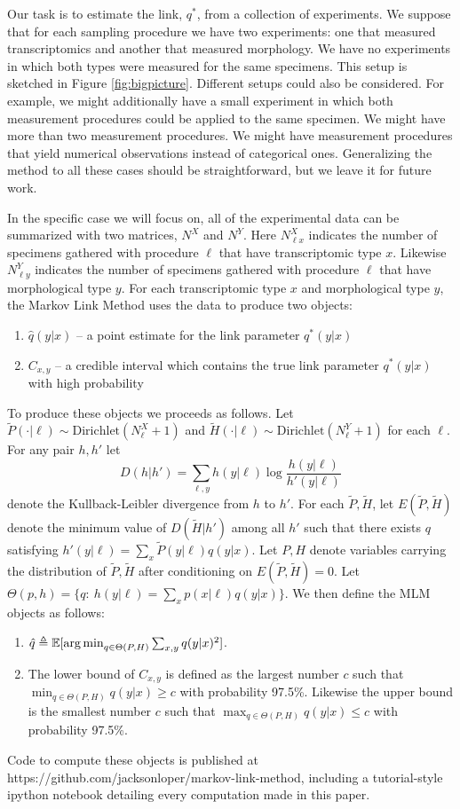 Our task is to estimate the link, $q^*$, from a collection of experiments.  We suppose that for each sampling procedure we have two experiments: one that measured transcriptomics and another that measured morphology.  We have no experiments in which both types were measured for the same specimens.  This setup is sketched in Figure \ref{fig:bigpicture}.  Different setups could also be considered.   For example, we might additionally have a small experiment in which both measurement procedures could be applied to the same specimen.  We might have more than two measurement procedures.  We might have measurement procedures that yield numerical observations instead of categorical ones.  Generalizing the method to all these cases should be straightforward, but we leave it for future work.  

In the specific case we will focus on, all of the experimental data can be summarized with two matrices, $N^X$ and $N^Y$.  Here $N^X_{\ell x}$ indicates the number of specimens gathered with procedure $\ell$ that have transcriptomic type $x$.  Likewise $N^Y_{\ell y}$ indicates the number of specimens gathered with procedure $\ell$ that have morphological type $y$.  For each transcriptomic type $x$ and morphological type $y$, the Markov Link Method uses the data to produce two objects:
%
\begin{enumerate}
    \item $\hat q(y|x)$ -- a point estimate for the link parameter $q^*(y|x)$
    \item $C_{x,y}$ -- a credible interval which contains the true link parameter $q^*(y|x)$ with high probability
\end{enumerate}
%
To produce these objects we proceeds as follows.  Let $\tilde P(\cdot |\ell) \sim \mathrm{Dirichlet}(N^X_\ell+1)$ and $\tilde H(\cdot |\ell) \sim \mathrm{Dirichlet}(N^Y_\ell+1)$ for each $\ell$.  For any pair $h,h'$ let 
\[
D(h|h') = \sum_{\ell,y} h(y|\ell) \log \frac{h(y|\ell)}{h'(y|\ell)}
\]
denote the Kullback-Leibler divergence from $h$ to $h'$.  For each $\tilde P,\tilde H$, let $E(\tilde P,\tilde H)$ denote the minimum value of $D(\tilde H|h')$ among all $h'$ such that there exists $q$ satisfying $h'(y|\ell)=\sum_x \tilde P(y|\ell)q(y|x)$.  Let $P,H$ denote variables carrying the distribution of $\tilde P,\tilde H$ after conditioning on $E(\tilde P,\tilde H)=0$.   Let $\Theta(p,h)=\{q:\ h(y|\ell) = \sum_x p(x|\ell)q(y|x)\}$.  We then define the MLM objects as follows:
\begin{enumerate}
    \item $\hat q\triangleq\mathbb{E}[\operatorname*{arg\,min}_{q\in \Theta(P,H)} \sum_{x,y} q(y|x)^2]$.
    \item The lower bound of $C_{x,y}$ is defined as the largest number $c$ such that $\min_{q\in \Theta(P,H)} q(y|x) \geq c$ with probability 97.5\%.  Likewise the upper bound is the smallest number $c$ such that $\max_{q\in \Theta(P,H)} q(y|x) \leq c$ with probability 97.5\%.
\end{enumerate} 
%
Code to compute these objects is published at https://github.com/jacksonloper/markov-link-method, including a tutorial-style ipython notebook detailing every computation made in this paper.

